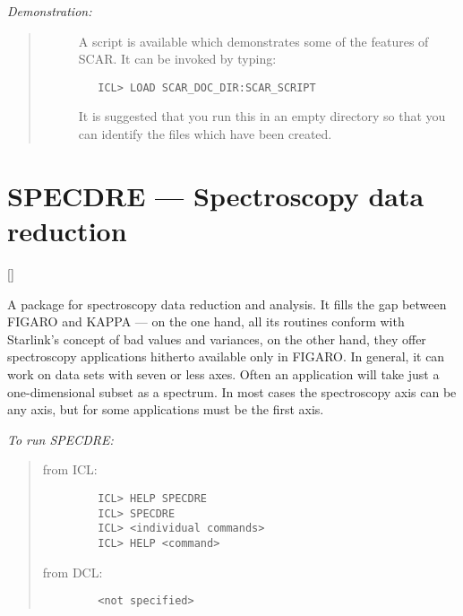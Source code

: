 {\em Demonstration:}\hfill
\begin{quote}
\begin{description}
\item [] A script is available which demonstrates some of the features of SCAR.
It can be invoked by typing:

\begin{small}
\begin{verbatim}
   ICL> LOAD SCAR_DOC_DIR:SCAR_SCRIPT
\end{verbatim}
\end{small}

It is suggested that you run this in an empty directory so that you can
identify the files which have been created.
\end{description}
\end{quote}

\newpage

\section{SPECDRE --- Spectroscopy data reduction}

\vspace{-11mm}

\hfill []

\vspace{5mm}

A package for spectroscopy data reduction and analysis.
It fills the gap between FIGARO and KAPPA --- on the one hand, all its routines
conform with Starlink's concept of bad values and variances, on the other hand,
they offer spectroscopy applications hitherto available only in FIGARO.
In general, it can work on data sets with seven or less axes.
Often an application will take just a one-dimensional subset as a spectrum.
In most cases the spectroscopy axis can be any axis, but for some applications
must be the first axis.

{\em To run SPECDRE:}\hfill
\begin{quote}
\begin{description}

\item [from ICL:]\hfill

\begin{small}
\begin{verbatim}
   ICL> HELP SPECDRE
   ICL> SPECDRE
   ICL> <individual commands>
   ICL> HELP <command>
\end{verbatim}
\end{small}

\item [from DCL:]\hfill

\begin{small}
\begin{verbatim}
   <not specified>
\end{verbatim}
\end{small}

\end{description}
\end{quote}

